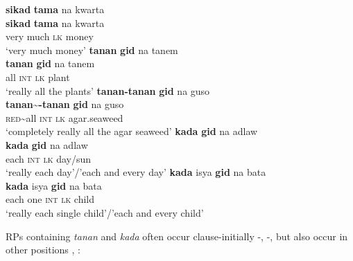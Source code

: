 \ea
\label{bkm:Ref425171721}
\textbf{sikad}  \textbf{tama}  na  kwarta \\\smallskip
 \gll \textbf{sikad}  \textbf{tama}  na  kwarta \\
very  much   \textsc{lk}  money \\
\glt ‘very much money’
\z
\ea
\textbf{tanan}  \textbf{gid}  na  tanem \\\smallskip
 \gll \textbf{tanan}  \textbf{gid}  na  tanem \\
all  \textsc{int}  \textsc{lk}  plant \\
\glt ‘really all the plants’
\z
\ea
\textbf{tanan-tanan} \textbf{gid}  na  guso \\\smallskip
 \gll \textbf{tanan\sim{}-tanan} \textbf{gid}  na  guso \\
\textsc{red}\sim{}all    \textsc{int}  \textsc{lk}  agar.seaweed \\
\glt ‘completely really all the agar seaweed’
\z
\ea
\textbf{kada}  \textbf{gid}  na  adlaw \\\smallskip
 \gll \textbf{kada}  \textbf{gid}  na  adlaw \\
each  \textsc{int}  \textsc{lk}  day/sun \\
\glt ‘really each day’/’each and every day’
\z
\ea
\label{bkm:Ref479341772}
\textbf{kada}  isya  \textbf{gid}  na  bata \\\smallskip
 \gll \textbf{kada}  isya  \textbf{gid}  na  bata \\
each  one  \textsc{int}  \textsc{lk}  child \\
\glt ‘really each single child’/’each and every child’
\z

RPs containing \textit{tanan} and \textit{kada} often occur clause-initially -, -, but also occur in other positions , :

